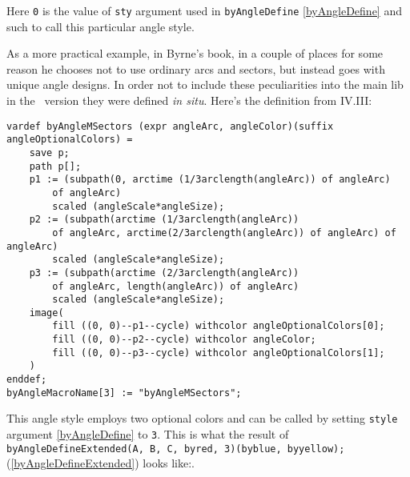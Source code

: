 	Here \texttt{0} is the value of \texttt{sty} argument used in \texttt{byAngleDefine} \ref{byAngleDefine} and such to call this particular angle style.
	
	As a more practical example, in Byrne's book, in a couple of places for some reason he chooses not to use ordinary arcs and sectors, but instead goes with unique angle designs. In order not to include these peculiarities into the main lib in the \ConTeXt\ version they were defined \textit{in situ}. Here's the definition from IV.III:

	
\begin{lstlisting}	
vardef byAngleMSectors (expr angleArc, angleColor)(suffix angleOptionalColors) =
    save p;
    path p[];
    p1 := (subpath(0, arctime (1/3arclength(angleArc)) of angleArc) 
    	of angleArc) 
    	scaled (angleScale*angleSize);
    p2 := (subpath(arctime (1/3arclength(angleArc)) 
    	of angleArc, arctime(2/3arclength(angleArc)) of angleArc) of angleArc) 
    	scaled (angleScale*angleSize);
    p3 := (subpath(arctime (2/3arclength(angleArc)) 
    	of angleArc, length(angleArc)) of angleArc) 
    	scaled (angleScale*angleSize);
    image(
        fill ((0, 0)--p1--cycle) withcolor angleOptionalColors[0];
        fill ((0, 0)--p2--cycle) withcolor angleColor;
        fill ((0, 0)--p3--cycle) withcolor angleOptionalColors[1];
    )
enddef;
byAngleMacroName[3] := "byAngleMSectors";
\end{lstlisting}

This angle style employs two optional colors and can be called by setting \texttt{style} argument \ref{byAngleDefine} to \texttt{3}. This is what the result of \texttt{byAngleDefineExtended(A, B, C, byred, 3)(byblue, byyellow);} (\ref{byAngleDefineExtended}) looks like:.

